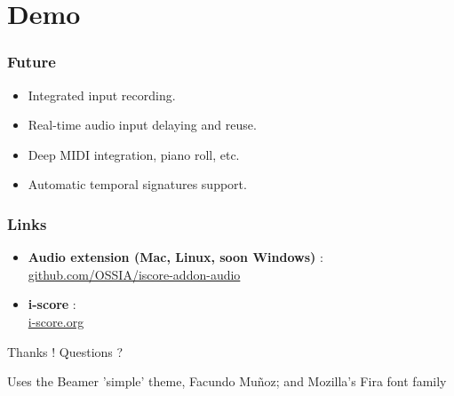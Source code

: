\documentclass{beamer}
\begin{document}
\section{Demo}
\begin{frame}
    \Huge
\end{frame}

\begin{frame}
	\frametitle{Future} 
	\Large
	\begin{itemize}
		\item<1> Integrated input recording.
		\item<2> Real-time audio input delaying and reuse.
		\item<3> Deep MIDI integration, piano roll, etc.
		\item<4> Automatic temporal signatures support.
		
	\end{itemize}
\end{frame}    

\begin{frame}
    \frametitle{Links} 
    \Large
    \begin{itemize}
        \setlength\itemsep{1em}
        \item \textbf{Audio extension ({\unicodefun Mac, Linux, soon Windows})} :~\\
        \url{github.com/OSSIA/iscore-addon-audio}
        \item \textbf{i-score} :~\\
         \url{i-score.org}
    \end{itemize}
        
    \centering
    \vspace{2em}
    \Large{Thanks ! Questions ?}
    \vspace{2em}
    
    \tiny{Uses the Beamer 'simple' theme, Facundo Muñoz; and Mozilla's Fira font family}
\end{frame}
\end{document}
